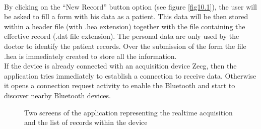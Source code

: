 \\By clicking on the “New Record” button option (see figure \ref{fig10.1}), the user will be asked to fill a form with his data as a patient. This data will be then stored within a header file (with .hea extension)  together with the file containing the effective record (.dat file extension). The personal data are only used by the doctor to identify the patient records.
\newpage
Over the submission of the form the file .hea is immediately created to store all the information.\\
If the device is already connected with an acquisition device Zecg, then the application tries immediately to establish a connection to receive data. Otherwise it opens a connection request activity to enable the Bluetooth and start to discover nearby Bluetooth devices.
\newpage
\begin{figure}[!htb]
	\centering
	\qquad
	\caption{Two screens of the application representing the realtime acquisition and the list of records within the device}  
	\label{fig10.3ab}
\end{figure}
